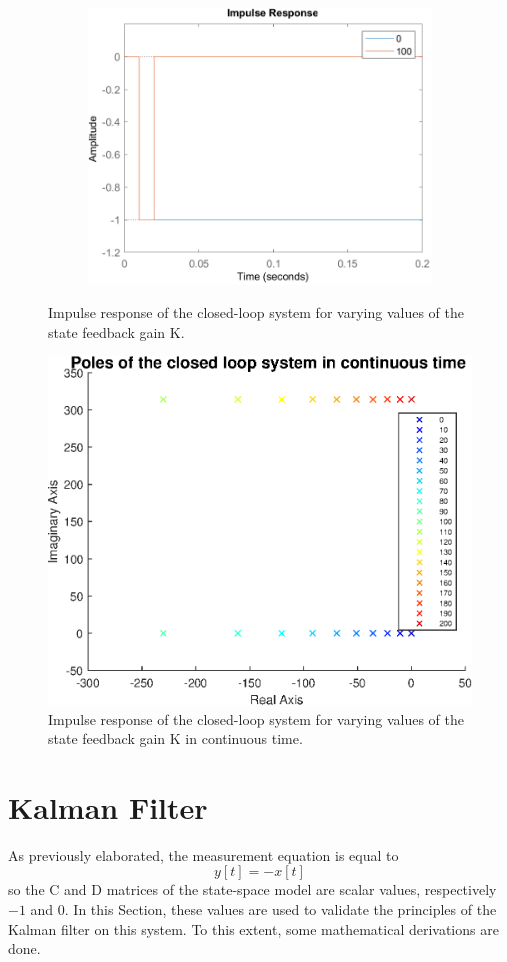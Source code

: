 \documentclass[a4paper,kul]{kulakarticle} %
\begin{document}
\begin{figure}[htp!]
	\begin{subfigure}[b]{0.48\textwidth}  
		\centering 
		\includegraphics[width=\textwidth]{impulse_response3_cropped.pdf}
	\end{subfigure}
	\caption{Impulse response of the closed-loop system for varying values of the state feedback gain K.} 
	\label{fig:impulse_response}
\end{figure}
\begin{figure}
	\centering
	\includegraphics[width=0.6\linewidth]{poles_cont.eps}
	\caption{Impulse response of the closed-loop system for varying values of the state feedback gain K in continuous time.} 
	\label{fig:poles cont}
\end{figure}
\newpage
\section{Kalman Filter}
As previously elaborated, the measurement equation is equal to 
\begin{equation}
	y[t] = -x[t]
	\label{eq:eq7}
\end{equation}
so the C and D matrices of the state-space model are scalar values, respectively $-1$ and $0$. In this Section, these values are used to validate the principles of the Kalman filter on this system. To this extent, some mathematical derivations are done. 
\end{document}
